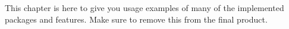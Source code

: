 
This chapter is here to give you usage examples of many of the implemented packages and features.
Make sure to remove this from the final product.
